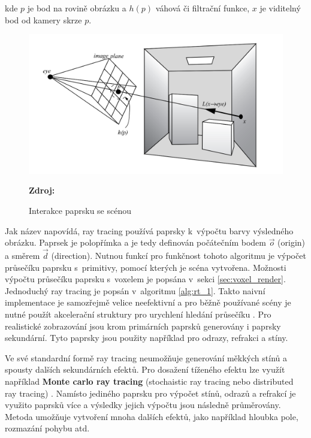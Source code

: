 kde $p$ je bod na rovině obrázku a $h(p)$ váhová či filtrační funkce, $x$ je viditelný bod od kamery skrze $p$.

\begin{figure}[H]
	\centering
	\includegraphics[scale=1]{obrazky-figures/ray_tracing_plane.png}
	\caption{Interakce paprsku se scénou}
	\textbf{Zdroj: \cite{advanced_global}}
	\label{fig:3d_grid}
\end{figure}


Jak název napovídá, ray tracing používá paprsky k~výpočtu barvy výsledného obrázku. Paprsek je polopřímka a je tedy definován počátečním bodem $\Vec{o}$ (origin) a směrem $\Vec{d}$ (direction). Nutnou funkcí pro funkčnost tohoto algoritmu je výpočet průsečíku paprsku s~primitivy, pomocí kterých je scéna vytvořena. Možnosti výpočtu průsečíku paprsku s~voxelem je popsána v~sekci \ref{sec:voxel_render}. Jednoduchý ray tracing je popsán v~algoritmu \ref{alg:rt_1}. Takto naivní implementace je samozřejmě velice neefektivní a pro běžně používané scény je nutné použít akcelerační struktury pro urychlení hledání průsečíku \cite{accelerated_rt}. Pro realistické zobrazování jsou krom primárních paprsků generovány i paprsky sekundární. Tyto paprsky jsou použity například pro odrazy, refrakci a stíny.

Ve své standardní formě ray tracing neumožňuje generování měkkých stínů a spousty dalších sekundárních efektů.  Pro dosažení tíženého efektu lze využít například \textbf{Monte carlo ray tracing} (stochaistic ray tracing nebo distributed ray tracing) \cite{distributed_rt}. Namísto jediného paprsku pro výpočet stínů, odrazů a refrakcí je využito paprsků více a výsledky jejich výpočtu jsou následně průměrovány. Metoda umožňuje vytvoření mnoha dalších efektů, jako například hloubka pole, rozmazání pohybu atd.

